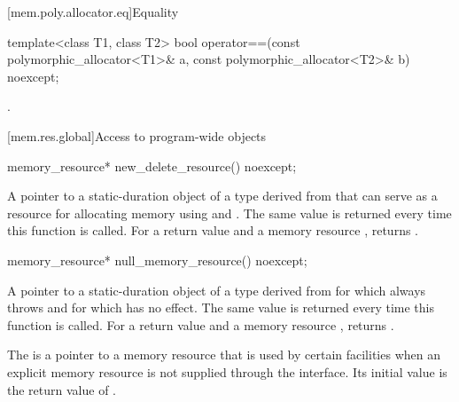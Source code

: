 [mem.poly.allocator.eq]{Equality}

%
\begin{itemdecl}
template<class T1, class T2>
  bool operator==(const polymorphic_allocator<T1>& a,
                  const polymorphic_allocator<T2>& b) noexcept;
\end{itemdecl}

\begin{itemdescr}
\pnum
\returns
{}.
\end{itemdescr}

[mem.res.global]{Access to program-wide  objects}

%
\begin{itemdecl}
memory_resource* new_delete_resource() noexcept;
\end{itemdecl}

\begin{itemdescr}
\pnum
\returns
A pointer to a static-duration object of a type derived from 
that can serve as a resource for allocating memory
using  and .
The same value is returned every time this function is called.
For a return value  and a memory resource ,
 returns .
\end{itemdescr}

%
\begin{itemdecl}
memory_resource* null_memory_resource() noexcept;
\end{itemdecl}

\begin{itemdescr}
\pnum
\returns
A pointer to a static-duration object of a type derived from 
for which  always throws  and
for which  has no effect.
The same value is returned every time this function is called.
For a return value  and a memory resource ,
 returns .
\end{itemdescr}

\pnum
The  is a pointer to a memory resource
that is used by certain facilities when an explicit memory resource
is not supplied through the interface.
Its initial value is the return value of .

